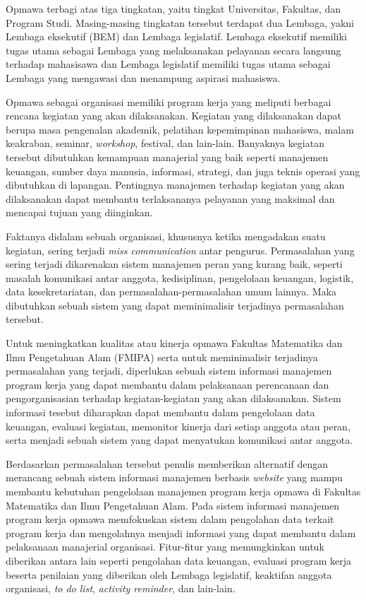 Opmawa terbagi atas tiga tingkatan, yaitu tingkat Universitas, Fakultas, dan Program Studi. Masing-masing tingkatan tersebut terdapat dua Lembaga, yakni Lembaga eksekutif (BEM) dan Lembaga legislatif. Lembaga eksekutif memiliki tugas utama sebagai Lembaga yang melaksanakan pelayanan secara langsung terhadap mahasisawa dan Lembaga legislatif memiliki tugas utama sebagai Lembaga yang mengawasi dan menampung aspirasi mahasiswa. 

Opmawa sebagai organisasi memiliki program kerja yang meliputi berbagai rencana kegiatan yang akan dilaksanakan. Kegiatan yang dilaksanakan dapat berupa masa pengenalan akademik, pelatihan kepemimpinan mahasiswa, malam keakraban, seminar, \emph{workshop}, festival, dan lain-lain. Banyaknya kegiatan tersebut dibutuhkan kemampuan manajerial yang baik seperti manajemen keuangan, sumber daya manusia, informasi, strategi, dan juga teknis operasi yang dibutuhkan di lapangan. Pentingnya manajemen terhadap kegiatan yang akan dilaksanakan dapat membantu terlaksananya pelayanan yang maksimal dan mencapai tujuan yang diinginkan.

Faktanya didalam sebuah organisasi, khususnya ketika mengadakan suatu kegiatan, sering terjadi \emph{miss communication} antar pengurus. Permasalahan yang sering terjadi dikarenakan sistem manajemen peran yang kurang baik, seperti masalah komunikasi antar anggota, kedisiplinan, pengelolaan keuangan, logistik, data kesekretariatan, dan permasalahan-permasalahan umum lainnya. Maka dibutuhkan sebuah sistem yang dapat meminimalisir terjadinya permasalahan tersebut.

Untuk meningkatkan kualitas atau kinerja opmawa Fakultas Matematika dan Ilmu Pengetahuan Alam (FMIPA) serta untuk meminimalisir terjadinya permasalahan yang terjadi, diperlukan sebuah sistem informasi manajemen program kerja yang dapat membantu dalam pelaksanaan perencanaan dan pengorganisasian terhadap kegiatan-kegiatan yang akan dilaksanakan. Sistem informasi tesebut diharapkan dapat membantu dalam pengelolaan data keuangan, evaluasi kegiatan, memonitor kinerja dari setiap anggota atau peran, serta menjadi sebuah sistem yang dapat menyatukan komunikasi antar anggota.

Berdasarkan permasalahan tersebut penulis memberikan alternatif dengan merancang sebuah sistem informasi manajemen berbasis \emph{website} yang mampu membantu kebutuhan pengelolaan manajemen program kerja opmawa di Fakultas Matematika dan Ilmu Pengetahuan Alam. Pada sistem informasi manajemen program kerja opmawa memfokuskan sistem dalam pengolahan data terkait program kerja dan mengolahnya menjadi informasi yang dapat membantu dalam pelaksanaan manajerial organisasi. Fitur-fitur yang memungkinkan untuk diberikan antara lain seperti pengolahan data keuangan, evaluasi program kerja beserta penilaian yang diberikan oleh Lembaga legislatif, keaktifan anggota organisasi, \emph{to do list}, \emph{activity reminder}, dan lain-lain.

